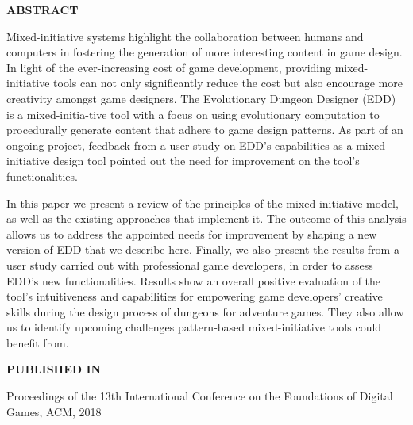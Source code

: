 




\normalfont
\textbf{\textsc{ABSTRACT}}

Mixed-initiative systems highlight the collaboration between humans and computers in fostering the generation of more interesting content in game design. In light of the ever-increasing cost of game development, providing mixed-initiative tools can not only significantly reduce the cost but also encourage more creativity amongst game designers. The Evolutionary Dungeon Designer (EDD) is a mixed-initia-tive tool with a focus on using evolutionary computation to procedurally generate content that adhere to game design patterns. As part of an ongoing project, feedback from a user study on EDD's capabilities as a mixed-initiative design tool pointed out the need for improvement on the tool's functionalities.

In this paper we present a review of the principles of the mixed-initiative model, as well as the existing approaches that implement it. The outcome of this analysis allows us to address the appointed needs for improvement by shaping a new version of EDD that we describe here. Finally, we also present the results from a user study carried out with professional game developers, in order to assess EDD's new functionalities. Results show an overall positive evaluation of the tool's intuitiveness and capabilities for empowering game developers' creative skills during the design process of dungeons for adventure games. They also allow us to identify upcoming challenges pattern-based mixed-initiative tools could benefit from.

\textbf{\textsc{PUBLISHED IN}}

Proceedings of the 13th International Conference on the Foundations of Digital Games, ACM, 2018

